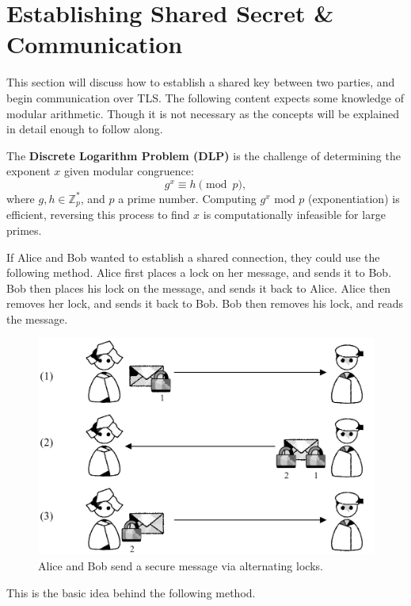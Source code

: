 \newpage
\section{Establishing Shared Secret \& Communication}
\noindent
This section will discuss how to establish a shared key between two parties, and 
begin communication over TLS. The following content expects some knowledge of modular arithmetic.
Though it is not necessary as the concepts will be explained in detail enough to follow along.

\begin{Def}

    \label{def:dlp}
    The \textbf{Discrete Logarithm Problem (DLP)} is the challenge of determining the exponent $x$ given
    modular congruence:
    \[
    g^x \equiv h \pmod{p},
    \]
    where $g,h\in\mathbb{Z}_p^*$, and $p$ a prime number.
    Computing $g^x \text{ mod } p$ (exponentiation) is efficient, reversing this process to find $x$ is computationally infeasible for large primes.  \hfill \cite{goldberg_cs357}
\end{Def}

\noindent
If Alice and Bob wanted to establish a shared connection, they could use the following method.
Alice first places a lock on her message, and sends it to Bob. Bob then places his lock on the message, and sends it back to Alice. Alice then removes her lock, and sends it back to Bob. Bob then removes his lock, and reads the message.

\begin{figure}[h!]
    \centering
    \includegraphics[width=.7\textwidth]{Sections/sec/enc/dh/pass.png}
    \caption{Alice and Bob send a secure message via alternating locks.}
    \label{fig:dh}
\end{figure}

\noindent
This is the basic idea behind the following method.

\newpage 

